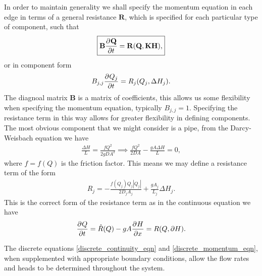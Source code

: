 In order to maintain generality we shall specify the momentum equation in each edge in terms of a general resistance $\mathbf{R}$, which is specified for each particular type of component, such that 
\begin{align}\label{discrete_momentum_eqn}
\boxed{ \mathbf{B} \frac{\partial^{} \mathbf{Q}}{\partial t^{}}  = \mathbf{R}(\mathbf{Q}, \mathbf{K} \mathbf{H}),}
\end{align}
or in component form
\begin{align}
B_{j,j} \frac{\partial^{} Q_j}{\partial t^{}} = R_j( Q_j, \Delta H_j ).
\end{align}
The diagnoal matrix $\mathbf{B}$ is a matrix of coefficients, this allows us some flexibility when specifying the momentum equation, typically $B_{j,j} = 1$.
Specifying the resistance term in this way allows for greater flexibility in defining components. The most obvious component that we might consider is a pipe, from the Darcy-Weisbach equation we have
\begin{align}
\frac{\Delta H}{L} = \frac{f Q^2}{2 g D A^2} \implies \frac{f Q^2}{2 D A} - \frac{g A \Delta H}{L} = 0,
\end{align}
where $f = f(Q)$ is the friction factor. This means we may define a resistance term of the form
\begin{align}\label{pipe_resistance}
\boxed{ R_j = - \frac{f(Q_j)Q_j|Q_j|}{2 D_j A_j} + \frac{g A_j}{L_j} \Delta H_j. }
\end{align}
This is the correct form of the resistance term as in the continuous equation we have
\begin{align*}
\frac{\partial^{} Q}{\partial t^{}} = \hat{R}(Q) - g A \frac{\partial^{} H}{\partial x^{}} = R( Q, \partial H).
\end{align*}


The discrete equations \eqref{discrete_continuity_eqn} and \eqref{discrete_momentum_eqn}, when supplemented with appropriate boundary conditions, allow the flow rates and heads to be determined throughout the system. 
